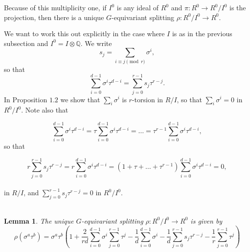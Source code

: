 \documentclass[reqno]{amsart}
\newtheorem{lemma}[thm]{Lemma}
\theoremstyle{definition}
\theoremstyle{remark}
\def\Q{\mathbb{Q}}
\def\Z{\mathbb{Z}}
\def\tensor{\otimes}
\begin{document}

Because of this multiplicity one, if $I^0$ is any ideal of $R^0$ and
$\pi:R^0\to R^0/I^0$ is the projection, then there is a unique
$G$-equivariant splitting $\rho:R^0/I^0\to R^0$.

We want to work this out explicitly in the case where $I$ is as in the
previous subsection and $I^0=I\tensor\Q$.
We write 
$$s_j=\sum_{i\equiv j\pmod r}\sigma^i,$$ 
so that
$$\sum_{i=0}^{d-1}\sigma^i\tau^{d-i}=\sum_{j=0}^{r-1}s_j\tau^{r-j}.$$
In Proposition $1.2$ we show that $\sum _i \sigma ^i$ is $r$-torsion in $R/I$, so that $\sum _i \sigma ^i = 0$ in $R^0/I^0$. Note also that

$$\sum _{i=0}^{d-1} \sigma ^i \tau ^{d-i} = \tau \sum _{i=0}^{d-1} \sigma ^i \tau ^{d-i} = \hdots = \tau ^{r-1} \sum _{i=0}^{d-1} \sigma ^i \tau ^{d-i} ,$$
so that  

$$r \sum _{j=0}^{r-1} s_j  \tau ^{r-j} = r \sum _{i=0}^{d-1} \sigma ^i \tau ^{d-i} = (1 + \tau + \hdots + \tau ^{r-1}) \sum _{i=0}^{d-1} \sigma ^i \tau ^{d-i} = 0,$$\\
in $R/I$, and $\sum _{j=0}^{r-1} s_j  \tau ^{r-j} = 0$ in $R^0/I^0$.\\ \\

\begin{lemma}
The unique $G$-equivariant splitting
$\rho:R^0/I^0\to R^0$ is given by
$$\rho(\sigma^a\tau^b)=
\sigma^a\tau^b\left(1+\frac2{rd}\sum_{i=0}^{d-1}\sigma^i\sum_{j=0}^{r-1}\tau^j-\frac1d \sum_{i=0}^{d-1}\sigma^i
-\frac1d\sum_{j=0}^{r-1}s_j\tau^{r-j}-\frac1r\sum_{j=0}^{r-1}\tau^j\right)$$
\end{lemma}
\end{document}
